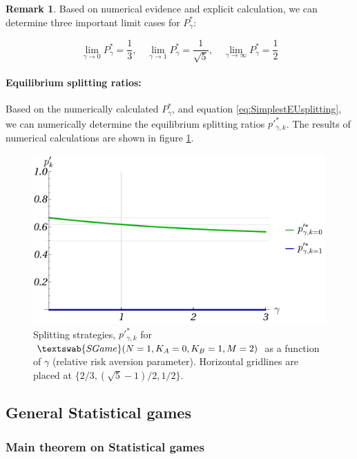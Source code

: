 \documentclass{article}
\theoremstyle{definition}
\newtheorem*{remark}{Remark}
\newcommand{\SG}[1]{$\textswab{SGame}(#1)$}
\begin{document}
\begin{remark}
    Based on numerical evidence and explicit calculation, we can determine three important limit cases for $P^*_\gamma$:

    \begin{equation}
        \lim_{\gamma \to 0} P^*_\gamma = \frac{1}{3}, \quad
        \lim_{\gamma \to 1} P^*_\gamma = \frac{1}{\sqrt{5}}, \quad
        \lim_{\gamma \to \infty} P^*_\gamma = \frac{1}{2}
    \end{equation}

\end{remark}

\paragraph{Equilibrium splitting ratios:}

Based on the numerically calculated $P^*_\gamma$, and equation \eqref{eq:SimplestEUsplitting}, we can numerically determine the equilibrium splitting ratios $p'^*_{\gamma,k}$.
The results of numerical calculations are shown in figure \ref{fig:pp(gamma)_1012}.
    
\begin{figure}[H]
    \centering
    \includegraphics[width=10 cm]{img/pp_gamma_1_0_1_2.pdf}
    \caption{Splitting strategies, $p'^*_{\gamma,k}$ for \SG{N=1, K_A=0, K_B=1, M=2} as a function of $\gamma$ (relative risk aversion parameter). Horizontal gridlines are placed at $\{2/3 , (\sqrt{5}-1)/2, 1/2\}$.}
    \label{fig:pp(gamma)_1012}
\end{figure}

\subsection{General Statistical games}

\subsubsection{Main theorem on Statistical games}
\end{document}
